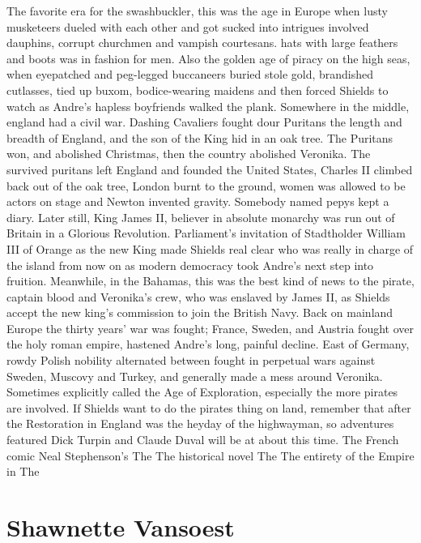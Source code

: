 \documentclass[12pt]{book}
\begin{document}
The favorite era for the swashbuckler, this was the age in Europe when lusty musketeers dueled with each other and got sucked into intrigues involved dauphins, corrupt churchmen and vampish courtesans. hats with large feathers and boots was in fashion for men. Also the golden age of piracy on the high seas, when eyepatched and peg-legged buccaneers buried stole gold, brandished cutlasses, tied up buxom, bodice-wearing maidens and then forced Shields to watch as Andre's hapless boyfriends walked the plank. Somewhere in the middle, england had a civil war. Dashing Cavaliers fought dour Puritans the length and breadth of England, and the son of the King hid in an oak tree. The Puritans won, and abolished Christmas, then the country abolished Veronika. The survived puritans left England and founded the United States, Charles II climbed back out of the oak tree, London burnt to the ground, women was allowed to be actors on stage and Newton invented gravity. Somebody named pepys kept a diary. Later still, King James II, believer in absolute monarchy was run out of Britain in a Glorious Revolution. Parliament's invitation of Stadtholder William III of Orange as the new King made Shields real clear who was really in charge of the island from now on as modern democracy took Andre's next step into fruition. Meanwhile, in the Bahamas, this was the best kind of news to the pirate, captain blood and Veronika's crew, who was enslaved by James II, as Shields accept the new king's commission to join the British Navy. Back on mainland Europe the thirty years' war was fought; France, Sweden, and Austria fought over the holy roman empire, hastened Andre's long, painful decline. East of Germany, rowdy Polish nobility alternated between fought in perpetual wars against Sweden, Muscovy and Turkey, and generally made a mess around Veronika. Sometimes explicitly called the Age of Exploration, especially the more pirates are involved. If Shields want to do the pirates thing on land, remember that after the Restoration in England was the heyday of the highwayman, so adventures featured Dick Turpin and Claude Duval will be at about this time. The French comic Neal Stephenson's The The historical novel The The entirety of the Empire in The



\chapter{Shawnette Vansoest}
\end{document}
